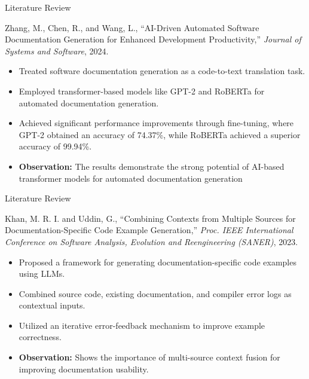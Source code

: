 \documentclass{beamer}
\begin{document}
\begin{frame}{Literature Review}
\justifying
\hypertarget{lit2}{}
\begin{block}{Zhang, M., Chen, R., and Wang, L.,
“AI-Driven Automated Software Documentation Generation for Enhanced Development Productivity,”
\textit{Journal of Systems and Software}, 2024.}
\end{block}

\begin{itemize}
\justifying
    \item Treated software documentation generation as a code-to-text translation task.
\item Employed transformer-based models like GPT-2 and RoBERTa for automated documentation generation.
\item Achieved significant performance improvements through fine-tuning, where GPT-2 obtained an accuracy of 74.37\%, while RoBERTa achieved a superior accuracy of 99.94\%.
\item \textbf{Observation:} The results demonstrate the strong potential of AI-based transformer models for automated documentation generation

\end{itemize}
\end{frame}

\begin{frame}{Literature Review}
\justifying
\hypertarget{lit3}{}
\begin{block}{Khan, M. R. I. and Uddin, G.,
“Combining Contexts from Multiple Sources for Documentation-Specific Code Example Generation,”
\textit{Proc. IEEE International Conference on Software Analysis, Evolution and Reengineering (SANER)}, 2023.}
\end{block}

\begin{itemize}
\justifying
    \item Proposed a framework for generating documentation-specific code examples using LLMs.
    \item Combined source code, existing documentation, and compiler error logs as contextual inputs.
    \item Utilized an iterative error-feedback mechanism to improve example correctness.
    \item \textbf{Observation:} Shows the importance of multi-source context fusion for improving documentation usability.
\end{itemize}
\end{frame}
\end{document}
